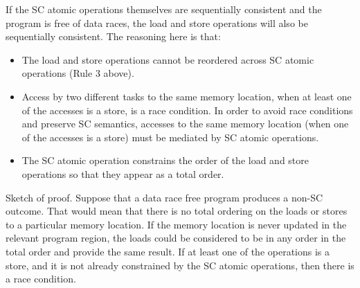 If the SC atomic operations themselves are sequentially consistent and the
program is free of data races, the load and store operations will also be
sequentially consistent. The reasoning here is that:

\begin{itemize}

 \item The load and store operations cannot be reordered across SC atomic
 operations (Rule 3 above).

 \item Access by two different tasks to the same memory location, when at least
 one of the accesses is a store, is a race condition. In order to avoid race
 conditions and preserve SC semantics, accesses to the same memory location
 (when one of the accesses is a store) must be mediated by SC atomic
 operations.

 \item The SC atomic operation constrains the order of the load and store
 operations so that they appear as a total order.
\end{itemize}

Sketch of proof. Suppose that a data race free program produces a non-SC
outcome. That would mean that there is no total ordering on the loads or stores
to a particular memory location. If the memory location is never updated in the
relevant program region, the loads could be considered to be in any order in
the total order and provide the same result. If at least one of the operations
is a store, and it is not already constrained by the SC atomic operations, then
there is a race condition.


